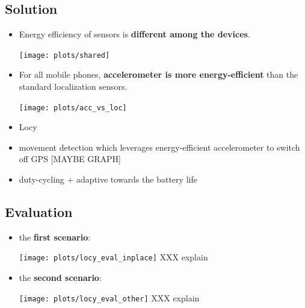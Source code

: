 \documentclass[a2,landscape]{a0poster}
\begin{document}
\mbox{}\framebreak
\begin{center}
\section*{Solution}
\end{center}
\begin{itemize}
   \item Energy efficiency of sensors is \textbf{different among the devices}.
   
\texttt{[image: plots/shared]}

   \item For all mobile phones, \textbf{accelerometer is more energy-efficient} than the standard localization sensors.

\texttt{[image: plots/acc\_vs\_loc]}

   \item Locy
   \item movement detection which leverages energy-efficient accelerometer to switch off GPS [MAYBE GRAPH]
   \item duty-cycling + adaptive towards the battery life
  \end{itemize}


\mbox{}\framebreak
\begin{center}
\section*{Evaluation}
\end{center}
\begin{itemize}
   \item the \textbf{first scenario}:
   
\texttt{[image: plots/locy\_eval\_inplace]}
XXX explain 

   \item the \textbf{second scenario}:
   
\texttt{[image: plots/locy\_eval\_other]}
XXX explain 

  \end{itemize}
\end{document}
